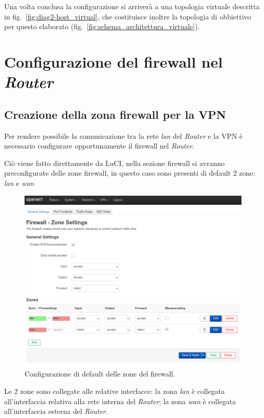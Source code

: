 Una volta conclusa la configurazione si arriverà a una topologia virtuale descritta in fig.~\ref{fig:diag2-host_virtual}, che costituisce inoltre la topologia di obbiettivo per questo elaborato (fig.~\ref{fig:schema_architettura_virtuale}).

\section{Configurazione del firewall nel \textit{Router} \ok}

\subsection{Creazione della zona firewall per la VPN \ok}
\label{subsec:creazione-firewall-zone-vpn}

Per rendere possibile la comunicazione tra la rete \textit{lan} del \textit{Router} e la VPN è necessario configurare opportunamente il firewall nel \textit{Router}.

Ciò viene fatto direttamente da LuCI, nella sezione firewall si avranno preconfigurate delle zone firewall, in questo caso sono presenti di default 2 zone: \textit{lan} e \textit{wan}

\begin{figure}[H]
    \centering
    \includegraphics[width=1\linewidth]{immagini/LuCI_firewall_init1}
    \caption{Configurazione di default delle zone del firewall.}
    \label{fig:luci-firewall-init}
\end{figure}

Le 2 zone sono collegate alle relative interfacce: la zona \textit{lan} è collegata all'interfaccia relativa alla rete interna del \textit{Router}; la zona \textit{wan} è collegata all'interfaccia esterna del \textit{Router}. 

